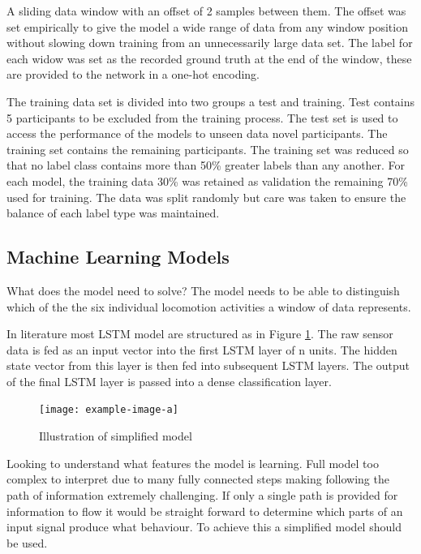\documentclass[sensors,article,submit,moreauthors,pdftex]{Definitions/mdpi}
\begin{document}
A sliding data window with an offset of 2 samples between them. The offset was set empirically to give the model a wide range of data from any window position without slowing down training from an unnecessarily large data set. The label for each widow was set as the recorded ground truth at the end of the window, these are provided to the network in a one-hot encoding. 

The training data set is divided into two groups a test and training. Test contains 5 participants to be excluded from the training process. The test set is used to access the performance of the models to unseen data novel participants. The training set contains the remaining participants. The training set was reduced so that no label class contains more than 50\% greater labels than any another. For each model, the training data 30\% was retained as validation the remaining 70\% used for training. The data was split randomly but care was taken to ensure the balance of each label type was maintained.

\subsection{Machine Learning Models}
What does the model need to solve? 
The model needs to be able to distinguish which of the the six individual locomotion activities a window of data represents.

In literature most LSTM model are structured as in Figure \ref{fig:full_lstm_model}. The raw sensor data is fed as an input vector into the first LSTM layer of n units. The hidden state vector from this layer is then fed into subsequent LSTM layers. The output of the final LSTM layer is passed into a dense classification layer.

\begin{figure}[!htb]
    \centering
    \texttt{[image: example-image-a]}
    \caption{Illustration of simplified model}
    \label{fig:full_lstm_model}
\end{figure}

Looking to understand what features the model is learning. Full model too complex to interpret due to many fully connected steps making following the path of information extremely challenging. If only a single path is provided for information to flow it would be straight forward to determine which parts of an input signal produce what behaviour. To achieve this a simplified model should be used.
\end{document}

